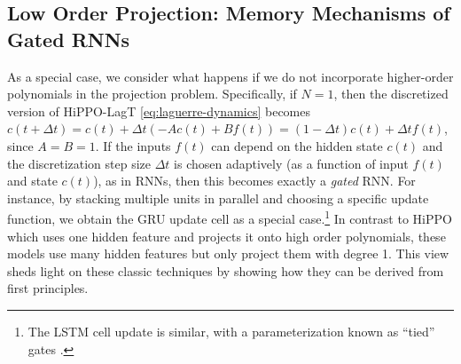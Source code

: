 \subsection{Low Order Projection: Memory Mechanisms of Gated RNNs}
\label{subsec:low_order_projection}

As a special case, we consider what happens if we do not incorporate higher-order polynomials in the projection problem.
Specifically, if $N=1$, then the discretized version of HiPPO-LagT \eqref{eq:laguerre-dynamics} becomes
$c(t + \Delta t) = c(t) + \Delta t(-Ac(t) + Bf(t)) = (1 - \Delta t)c(t) + \Delta t f(t)$, since $A = B = 1$.
If the inputs $f(t)$ can depend on the hidden state $c(t)$ and the discretization step size $\Delta t$ is chosen adaptively (as a function of input $f(t)$ and state $c(t)$),
as in RNNs, then this becomes exactly a \emph{gated} RNN.
For instance, by stacking multiple units in parallel and choosing a specific update function,
we obtain the GRU update cell as a special case.\footnote{The LSTM cell update is similar, with a parameterization known as ``tied'' gates \cite{greff2016lstm}.}
In contrast to HiPPO which uses one hidden feature and projects it onto high order polynomials,
these models use many hidden features but only project them with degree 1.
This view sheds light on these classic techniques by showing how they can be derived from first principles.




